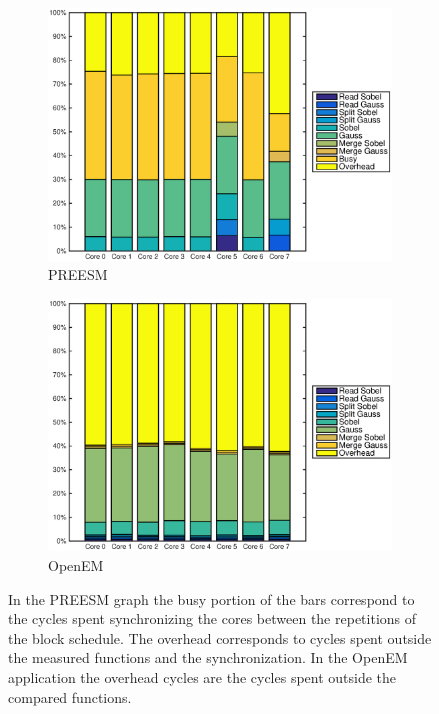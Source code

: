 \begin{figure}
    \centering
    \begin{subfigure}[t]{0.49\textwidth}
        \centering
        \includegraphics[width=0.99\linewidth]{images/preesm_cifcif.eps}
        \caption{PREESM}
        \label{fig:preesmcif}
    \end{subfigure}
    \begin{subfigure}[t]{0.49\textwidth}
        \centering
        \includegraphics[width=0.99\linewidth]{images/openem_cifcif_2initial_func.eps}
        \caption{OpenEM}
        \label{fig:oem8corefunc}
    \end{subfigure}
    \caption{In the PREESM graph the busy portion of the bars correspond to the
        cycles spent synchronizing the cores between the repetitions of the
        block schedule. The overhead corresponds to cycles spent outside the
        measured functions and the synchronization. In the OpenEM application
        the overhead cycles are the cycles spent outside the compared
    functions.}
\end{figure}

